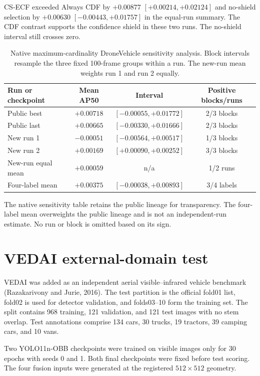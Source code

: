 \documentclass[11pt]{article}
\begin{document}
CS-ECF exceeded Always CDF by \(+0.00877\)
\([+0.00214,+0.02124]\) and no-shield selection by \(+0.00630\)
\([-0.00443,+0.01757]\) in the equal-run summary. The CDF contrast supports the
confidence shield in these two runs. The no-shield interval still crosses zero.

\begin{table}[ht]
\centering
\small
\caption{Native maximum-cardinality DroneVehicle sensitivity analysis. Block
intervals resample the three fixed 100-frame groups within a run. The
new-run mean weights run 1 and run 2 equally.}
\label{tab:prospective-obb}
\begin{tabular}{@{}lccc@{}}
\toprule
Run or checkpoint & Mean AP50 & Interval & Positive blocks/runs \\
\midrule
Public best & \(+0.00718\) & \([-0.00055,+0.01772]\) & 2/3 blocks \\
Public last & \(+0.00665\) & \([-0.00330,+0.01666]\) & 2/3 blocks \\
New run 1 & \(-0.00051\) & \([-0.00564,+0.00517]\) & 1/3 blocks \\
New run 2 & \(+0.00169\) & \([+0.00090,+0.00252]\) & 3/3 blocks \\
New-run equal mean & \(+0.00059\) & n/a & 1/2 runs \\
Four-label mean & \(+0.00375\) & \([-0.00038,+0.00893]\) & 3/4 labels \\
\bottomrule
\end{tabular}
\end{table}

The native sensitivity table retains the public lineage for transparency.
The four-label mean overweights the public lineage and is not an independent-run
estimate. No run or block is omitted based on its sign.

\section{VEDAI external-domain test}

VEDAI was added as an independent aerial visible--infrared vehicle benchmark
(Razakarivony and Jurie, 2016). The test partition is the official fold01 list,
fold02 is used for detector validation, and folds03--10 form the training set.
The split contains 968 training, 121 validation, and 121 test images with no
stem overlap. Test annotations comprise 134 cars, 30 trucks, 19 tractors, 39
camping cars, and 10 vans.

Two YOLO11n-OBB checkpoints were trained on visible images only for 30 epochs
with seeds 0 and 1. Both final checkpoints were fixed before test scoring. The
four fusion inputs were generated at the registered \(512\times512\) geometry.
\end{document}
